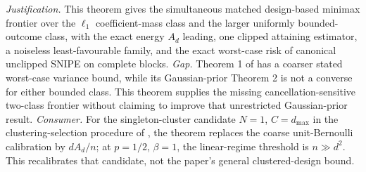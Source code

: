 \documentclass{article}
\begin{document}
\par\smallskip\noindent \textit{Justification.} This theorem gives the simultaneous matched design-based minimax frontier over the \(\ell_1\) coefficient-mass class and the larger uniformly bounded-outcome class, with the exact energy \(A_d\) leading, one clipped attaining estimator, a noiseless least-favourable family, and the exact worst-case risk of canonical unclipped SNIPE on complete blocks. \textit{Gap.} Theorem 1 of \cite{CortezRodriguezEichhornYu2023} has a coarser stated worst-case variance bound, while its Gaussian-prior Theorem 2 is not a converse for either bounded class. This theorem supplies the missing cancellation-sensitive two-class frontier without claiming to improve that unrestricted Gaussian-prior result. \textit{Consumer.} For the singleton-cluster candidate \(N=1\), \(C=d_{\max}\) in the clustering-selection procedure of \cite{EichhornKhanUganderYu2026}, the theorem replaces the coarse unit-Bernoulli calibration by \(dA_d/n\); at \(p=1/2\), \(\beta=1\), the linear-regime threshold is \(n\gg d^2\). This recalibrates that candidate, not the paper's general clustered-design bound.
\end{document}
